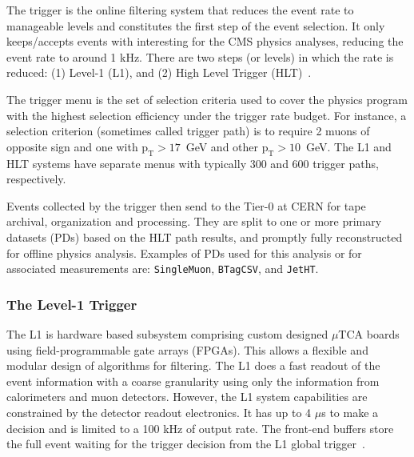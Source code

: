 The trigger is the online filtering system that reduces the event rate to manageable levels and constitutes the first step of the event selection. It only keeps/accepts events with interesting for the CMS physics analyses, reducing the event rate to around 1 kHz. There are two steps (or levels) in which the rate is reduced: (1) Level-1 (L1), and (2) High Level Trigger (HLT)~\cite{CMS:2008xjf,CMS:2006myw}. 

The trigger menu is the set of selection criteria used to cover the physics program with the highest selection efficiency under the trigger rate budget. For instance, a selection criterion (sometimes called trigger path) is to require 2 muons of opposite sign and one with $\mathrm{p_{T}>17}$~GeV and other $\mathrm{p_{T}>10}$~GeV. The L1 and HLT systems have separate menus with typically 300 and 600 trigger paths, respectively. 

Events collected by the trigger then send to the Tier-0 at CERN for tape archival, organization and processing. They are split to one or more primary datasets (PDs) based on the HLT path results, and promptly fully reconstructed for offline physics analysis. Examples of PDs used for this analysis or for associated measurements are: \verb|SingleMuon|, \verb|BTagCSV|, and \verb|JetHT|. 

\subsubsection{The Level-1 Trigger}
The L1 is hardware based subsystem comprising custom designed $\mu$TCA boards using field-programmable gate arrays (FPGAs). This allows a flexible and modular design of algorithms for filtering. The L1 does a fast readout of the event information with a coarse granularity using only the information from calorimeters and muon detectors. However, the L1 system capabilities are constrained by the detector readout electronics. It has up to 4 $\mu$s to make a decision and is limited to a 100 kHz of output rate. The front-end buffers store the full event waiting for the trigger decision from the L1 global trigger~\cite{CMS:2008xjf,CMS:2006myw}.

